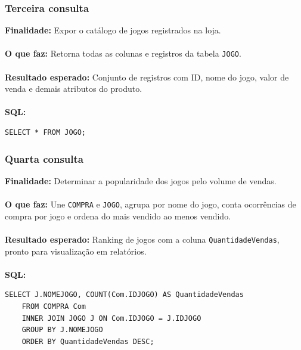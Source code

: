 \documentclass[11pt]{article}
\begin{document}
\subsubsection{Terceira consulta}
\textbf{Finalidade:} Expor o catálogo de jogos registrados na loja.\\\\
\textbf{O que faz:} Retorna todas as colunas e registros da tabela \texttt{JOGO}.\\\\
\textbf{Resultado esperado:} Conjunto de registros com ID, nome do jogo, valor de venda e demais atributos do produto.\\\\
\textbf{SQL:}
    \begin{Verbatim}[breaklines=true, breakanywhere=true]
    SELECT * FROM JOGO;
    \end{Verbatim}

\subsubsection{Quarta consulta}
\textbf{Finalidade:} Determinar a popularidade dos jogos pelo volume de vendas.\\\\
\textbf{O que faz:} Une \texttt{COMPRA} e \texttt{JOGO}, agrupa por nome do jogo, conta ocorrências de compra por jogo e ordena do mais vendido ao menos vendido.\\\\
\textbf{Resultado esperado:} Ranking de jogos com a coluna \texttt{QuantidadeVendas}, pronto para visualização em relatórios.\\\\
\textbf{SQL:}
    \begin{Verbatim}[breaklines=true, breakanywhere=true]
    SELECT J.NOMEJOGO, COUNT(Com.IDJOGO) AS QuantidadeVendas
    FROM COMPRA Com
    INNER JOIN JOGO J ON Com.IDJOGO = J.IDJOGO
    GROUP BY J.NOMEJOGO
    ORDER BY QuantidadeVendas DESC;
    \end{Verbatim}
    
\end{document}
